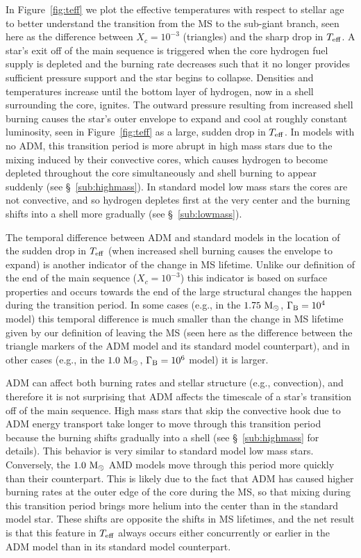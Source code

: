 \documentclass[useAMS,usenatbib]{mnras}
\begin{document}
In Figure~\ref{fig:teff} we plot the effective temperatures with respect to stellar age to better understand the transition from the MS to the sub-giant branch, seen here as the difference between $X_c = 10^{-3}$ (triangles) and the sharp drop in $T_{\mathrm{eff}}$. A star's exit off of the main sequence is triggered when the core hydrogen fuel supply is depleted and the burning rate decreases such that it no longer provides sufficient pressure support and the star begins to collapse. Densities and temperatures increase until the bottom layer of hydrogen, now in a shell surrounding the core, ignites. The outward pressure resulting from increased shell burning causes the star's outer envelope to expand and cool at roughly constant luminosity, seen in Figure~\ref{fig:teff} as a large, sudden drop in $T_{\mathrm{eff}}$. In models with no ADM, this transition period is more abrupt in high mass stars due to the mixing induced by their convective cores, which causes hydrogen to become depleted throughout the core simultaneously and shell burning to appear suddenly (see \S~\ref{sub:highmass}). In standard model low mass stars the cores are not convective, and so hydrogen depletes first at the very center and the burning shifts into a shell more gradually (see \S~\ref{sub:lowmass}). 

The temporal difference between ADM and standard models in the location of the sudden drop in $T_{\mathrm{eff}}$ (when increased shell burning causes the envelope to expand) is another indicator of the change in MS lifetime. Unlike our definition of the end of the main sequence ($X_c = 10^{-3}$) this indicator is based on surface properties and occurs towards the end of the large structural changes the happen during the transition period. In some cases (e.g., in the $1.75 \ \mathrm{M}_{\odot}$, $\Gamma_\mathrm{B} = 10^{4}$ model) this temporal difference is much smaller than the change in MS lifetime given by our definition of leaving the MS (seen here as the difference between the triangle markers of the ADM model and its standard model counterpart), and in other cases (e.g., in the $1.0 \ \mathrm{M}_{\odot}$, $\Gamma_\mathrm{B} = 10^{6}$ model) it is larger.

ADM can affect both burning rates and stellar structure (e.g., convection), and therefore it is not surprising that ADM affects the timescale of a star's transition off of the main sequence. High mass stars that skip the convective hook due to ADM energy transport take longer to move through this transition period because the burning shifts gradually into a shell (see \S~\ref{sub:highmass} for details). This behavior is very similar to standard model low mass stars. Conversely, the $1.0 \ \mathrm{M}_{\odot}$ AMD models move through this period more quickly than their \nodm counterpart. This is likely due to the fact that ADM has caused higher burning rates at the outer edge of the core during the MS, so that mixing during this transition period brings more helium into the center than in the standard model star. These shifts are opposite the shifts in MS lifetimes, and the net result is that this feature in $T_{\mathrm{eff}}$ always occurs either concurrently or earlier in the ADM model than in its standard model counterpart. 
\end{document}
